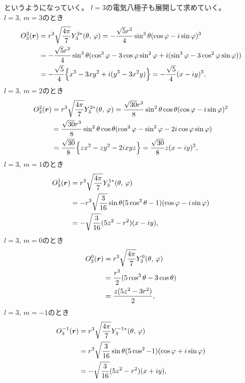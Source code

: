 \documentclass[../master.tex]{subfiles}
\begin{document}
というようになっていく。
\(l=3\)の電気八極子も展開して求めていく。
\(l=3,\,m=3\)のとき
\begin{equation}\begin{aligned}[b]
    O_3^3(\vb*{r})
    &= r^3 \sqrt{\frac{4\pi}{7}} Y_3^{3*}(\theta,\,\varphi)
    = -\frac{\sqrt{5}r^3}{4} \sin^3\theta (\cos\varphi-i\sin\varphi)^3\\
    &= -\frac{\sqrt{5}r^3}{4} \sin^3\theta (\cos^3\varphi - 3\cos\varphi\sin^2\varphi + i(\sin^3\varphi - 3\cos^2\varphi\sin\varphi))\\
    &= -\frac{\sqrt{5}}{4} \Big\{x^3-3xy^2+i(y^3- 3x^2y)\Big\}
    = -\frac{\sqrt{5}}{4} (x-iy)^3,
\end{aligned}\end{equation}
\(l=3,\,m=2\)のとき
\begin{equation}\begin{aligned}[b]
    O_3^2(\vb*{r})
    &= r^3 \sqrt{\frac{4\pi}{7}} Y_3^{2*}(\theta,\,\varphi)
    = \frac{\sqrt{30}r^3}{8} \sin^2\theta \cos\theta (\cos\varphi-i\sin\varphi)^2\\
    &= \frac{\sqrt{30}r^3}{8} \sin^2\theta \cos\theta (\cos^2\varphi - \sin^2\varphi - 2i\cos\varphi\sin\varphi)\\
    &= \frac{\sqrt{30}}{8} \Big\{zx^2-zy^2 -2ixyz\Big\}
    = \frac{\sqrt{30}}{8} z(x-iy)^2,
\end{aligned}\end{equation}
\(l=3,\,m=1\)のとき
\begin{equation}\begin{aligned}[b]
    O_3^1(\vb*{r})
    &= r^3 \sqrt{\frac{4\pi}{7}} Y_3^{1*}(\theta,\,\varphi)\\
    &= -r^3 \sqrt{\frac{3}{16}} \sin\theta(5\cos^2\theta-1)(\cos\varphi-i\sin\varphi)\\
    &=-\sqrt{\frac{3}{16}}(5z^2-r^2)(x-iy),
\end{aligned}\end{equation}
\(l=3,\,m=0\)のとき
\begin{equation}\begin{aligned}[b]
    O_3^0(\vb*{r})
    &= r^3 \sqrt{\frac{4\pi}{7}} Y_3^{0}(\theta,\,\varphi)\\
    &= \frac{r^3}{2}  (5\cos^3\theta-3\cos\theta)\\
    &= \frac{z(5z^2-3r^2)}{2},
\end{aligned}\end{equation}
\(l=3,\,m=-1\)のとき
\begin{equation}\begin{aligned}[b]
    O_3^{-1}(\vb*{r})
    &= r^3 \sqrt{\frac{4\pi}{7}} Y_3^{-1*}(\theta,\,\varphi)\\
    &= r^3 \sqrt{\frac{3}{16}} \sin\theta(5\cos^2-1)(\cos\varphi+i\sin\varphi)\\
    &=-\sqrt{\frac{3}{16}}(5z^2-r^2)(x+iy),
\end{aligned}\end{equation}
\end{document}
